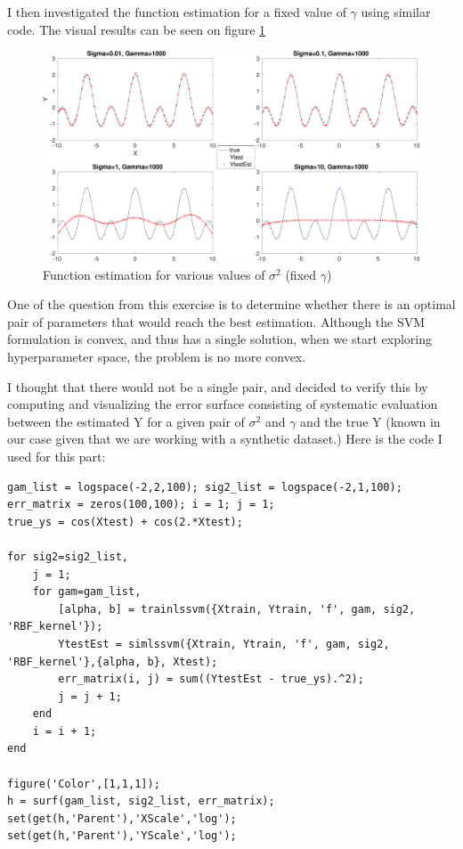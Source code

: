 \documentclass[11pt, a4paper]{article}
\begin{document}
I then investigated the function estimation for a fixed value of
$\gamma$ using similar code. The visual results can be seen on figure
\ref{fig:sumcos2}

\begin{figure}[H]
    \centering
    \includegraphics[scale=.40]{sumcos2.pdf}
    \caption{Function estimation for various values of $\sigma^2$ (fixed
      $\gamma$)}
    \label{fig:sumcos2}
\end{figure}

One of the question from this exercise is to determine whether there
is an optimal pair of parameters that would reach the best
estimation. Although the SVM formulation is convex, and thus has a
single solution, when we start exploring hyperparameter space, the
problem is no more convex. 

I thought that there would not be a single pair, and decided to verify
this by computing and visualizing the error surface consisting of
systematic evaluation between the estimated Y for a given pair of
$\sigma^2$ and $\gamma$ and the true Y (known in our case given that
we are working with a synthetic dataset.) Here is the code I used for
this part:

\begin{lstlisting}
gam_list = logspace(-2,2,100); sig2_list = logspace(-2,1,100);
err_matrix = zeros(100,100); i = 1; j = 1;
true_ys = cos(Xtest) + cos(2.*Xtest);

for sig2=sig2_list,
    j = 1;
    for gam=gam_list,
        [alpha, b] = trainlssvm({Xtrain, Ytrain, 'f', gam, sig2, 'RBF_kernel'});
        YtestEst = simlssvm({Xtrain, Ytrain, 'f', gam, sig2, 'RBF_kernel'},{alpha, b}, Xtest);
        err_matrix(i, j) = sum((YtestEst - true_ys).^2);
        j = j + 1;
    end
    i = i + 1;
end

figure('Color',[1,1,1]);
h = surf(gam_list, sig2_list, err_matrix);
set(get(h,'Parent'),'XScale','log');
set(get(h,'Parent'),'YScale','log');
\end{lstlisting}
\end{document}

